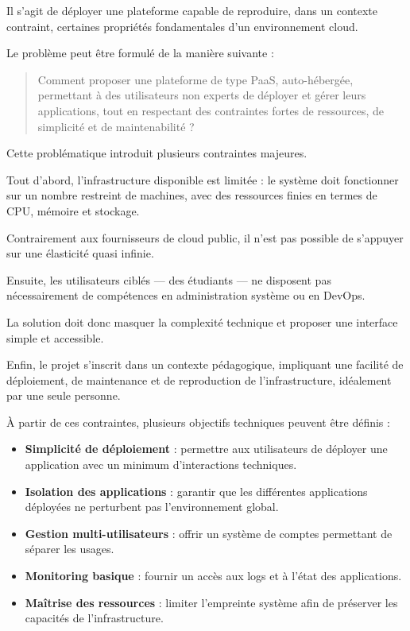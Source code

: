 \documentclass{rapportClass} %
\begin{document}
\smallskip
Il s’agit de déployer une plateforme capable de reproduire, dans un
contexte contraint, certaines propriétés fondamentales d’un
environnement cloud.

\smallskip
Le problème peut être formulé de la manière suivante :

\begin{quote}
Comment proposer une plateforme de type PaaS,
auto-hébergée, permettant à des utilisateurs non experts de déployer
et gérer leurs applications, tout en respectant des contraintes fortes
de ressources, de simplicité et de maintenabilité ?
\end{quote}

Cette problématique introduit plusieurs contraintes majeures.

\smallskip
Tout d’abord, l’infrastructure disponible est limitée : le
système doit fonctionner sur un nombre restreint de machines, avec des
ressources finies en termes de CPU, mémoire et stockage.

\smallskip
Contrairement aux fournisseurs de cloud public, il n’est pas possible
de s’appuyer sur une élasticité quasi infinie.

\smallskip
Ensuite, les utilisateurs ciblés — des étudiants — ne disposent pas
nécessairement de compétences en administration système ou en DevOps.

\smallskip
La solution doit donc masquer la complexité technique et proposer une
interface simple et accessible.

\smallskip
Enfin, le projet s’inscrit dans un contexte pédagogique, impliquant une
facilité de déploiement, de maintenance et de reproduction de
l’infrastructure, idéalement par une seule personne.

\smallskip
À partir de ces contraintes, plusieurs objectifs techniques peuvent
être définis :

\begin{itemize}[label=$\bullet$] 
\item \textbf{Simplicité de déploiement} : permettre aux utilisateurs de
déployer une application avec un minimum d’interactions techniques.
\item \textbf{Isolation des applications} : garantir que les différentes
applications déployées ne perturbent pas l’environnement global.
\item \textbf{Gestion multi-utilisateurs} : offrir un système de comptes
permettant de séparer les usages.
\item \textbf{Monitoring basique} : fournir un accès aux logs et à
l’état des applications.
\item \textbf{Maîtrise des ressources} : limiter l’empreinte système
afin de préserver les capacités de l’infrastructure.
\end{itemize}
\end{document}
